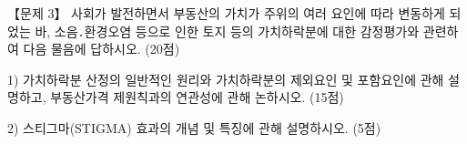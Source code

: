 \begin{longquestion}{【문제 3】}
사회가 발전하면서 부동산의 가치가 주위의 여러 요인에 따라 변동하게 되었는 바, 소음․환경오염 등으로 인한 토지 등의 가치하락분에 대한 감정평가와 관련하여 다음 물음에 답하시오. (20점) \par
1) 가치하락분 산정의 일반적인 원리와 가치하락분의 제외요인 및 포함요인에 관해 설명하고, 부동산가격 제원칙과의 연관성에 관해 논하시오. (15점) \par
2) 스티그마(STIGMA) 효과의 개념 및 특징에 관해 설명하시오. (5점) \par
\end{longquestion}
